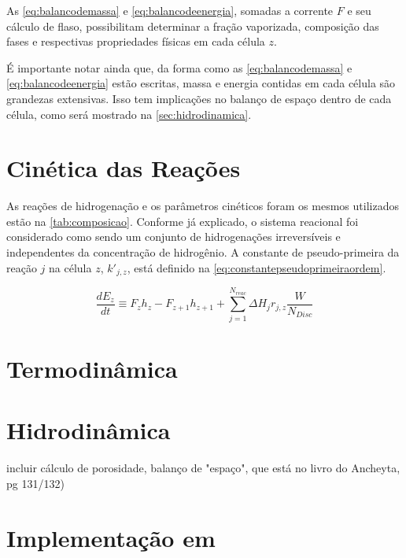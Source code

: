 As \autoref{eq:balancodemassa} e \autoref{eq:balancodeenergia}, somadas a corrente $F$ e seu cálculo de flaso, possibilitam determinar a fração vaporizada, composição das fases e respectivas propriedades físicas em cada célula $z$.

É importante notar ainda que, da forma como as \autoref{eq:balancodemassa} e \autoref{eq:balancodeenergia}  estão escritas, massa e energia contidas em cada célula são grandezas extensivas. Isso tem implicações no balanço de espaço dentro de cada célula, como será mostrado na \autoref{sec:hidrodinamica}.

\section{Cinética das Reações} \label{sec:cineticadasreacoes}

As reações de hidrogenação e os parâmetros cinéticos foram os mesmos utilizados estão na \autoref{tab:composicao}.  Conforme já explicado, o sistema reacional foi considerado como sendo um conjunto de hidrogenações irreversíveis e independentes da concentração de hidrogênio. A constante de pseudo-primeira da reação $j$ na célula $z$, $k'_{j,z}$, está definido na \autoref{eq:constantepseudoprimeiraordem}.

\begin{equation}
\dfrac{dE_{z}}{dt} \equiv F_zh_{z} - F_{z+1}h_{z+1} + \displaystyle\sum_{j=1}^{N_{reac}}
\Delta H_{j}r_{j,z} \dfrac{W}{N_{Disc}}
\label{eq:constantepseudoprimeiraordem}
\end{equation}

\section{Termodinâmica} \label{sec:termodinamica}

\section{Hidrodinâmica} \label{sec:hidrodinamica}

incluir cálculo de porosidade, balanço de "espaço", que está no livro do
Ancheyta, pg 131/132)

\section{Implementação em \emso} \label{sec:implementacao}






